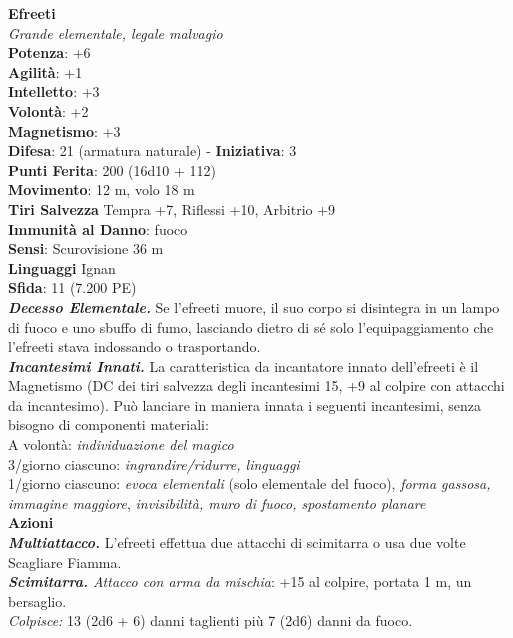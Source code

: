 \begin{multicols}{2}
\medskip\textbf{Efreeti}\\
\emph{Grande elementale, legale malvagio}\\
\textbf{Potenza}: +6\\
\textbf{Agilità}: +1\\
\textbf{Intelletto}: +3\\
\textbf{Volontà}: +2\\
\textbf{Magnetismo}: +3\\
\textbf{Difesa}: 21 (armatura naturale) - \textbf{Iniziativa}: 3\\
\textbf{Punti Ferita}: 200 (16d10 + 112) \\
\textbf{Movimento}: 12 m, volo 18 m\\
\textbf{Tiri Salvezza} Tempra +7, Riflessi +10, Arbitrio +9\\
\textbf{Immunità al Danno}: fuoco\\
\textbf{Sensi}: Scurovisione 36 m\\
\textbf{Linguaggi} Ignan\\
\textbf{Sfida}: 11 (7.200 PE)\smallskip\\
\emph{\textbf{Decesso Elementale.}} Se l'efreeti muore, il suo corpo si disintegra in un lampo di fuoco e uno sbuffo di fumo, lasciando dietro di sé solo l'equipaggiamento che l'efreeti stava indossando o trasportando.\\
\emph{\textbf{Incantesimi Innati.}} La caratteristica da incantatore innato dell'efreeti è il Magnetismo (DC dei tiri salvezza degli incantesimi 15, +9 al colpire con attacchi da incantesimo). Può lanciare in maniera innata i seguenti incantesimi, senza bisogno di componenti materiali:\\
A volontà: \emph{individuazione del magico}\\
3/giorno ciascuno: \emph{ingrandire/ridurre, linguaggi}\\
1/giorno ciascuno: \emph{evoca elementali} (solo elementale del fuoco), \emph{forma gassosa, immagine maggiore}, \emph{invisibilità, muro di fuoco, spostamento planare}\\
\smallskip\textbf{Azioni}\\
\emph{\textbf{Multiattacco.}} L'efreeti effettua due attacchi di scimitarra o usa due volte Scagliare Fiamma.\\
\emph{\textbf{Scimitarra.} Attacco con arma da mischia}: +15 al colpire, portata 1 m, un bersaglio.\\
\emph{Colpisce:} 13 (2d6 + 6) danni taglienti più 7 (2d6) danni da fuoco.\\

\end{multicols}
